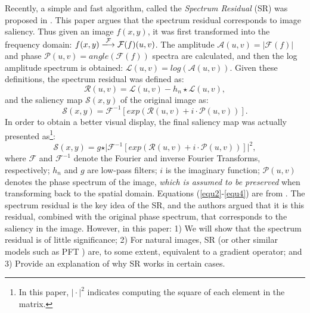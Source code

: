 \documentclass[10pt,journal,cspaper,compsoc]{IEEEtran}
\begin{document}
Recently, a simple and fast algorithm, called the {\it Spectrum Residual} (SR) was proposed in \cite{hou2007saliency}. This paper argues that the spectrum residual corresponds to image saliency. Thus given an image $f(x,y)$, it was first transformed into the frequency domain: $f(x,y)\xlongrightarrow{\mathcal F}{\mathcal F}(f)(u,v) $.
The amplitude ${\mathcal A}(u,v)=|{\mathcal F}(f)|$ and phase ${\mathcal P}(u,v) =angle({\mathcal F}(f))$ spectra are calculated, and then the log amplitude spectrum is obtained: ${\mathcal L}(u,v)=log({\mathcal A}(u,v))$. Given these definitions, the spectrum residual was defined as:
\begin{equation}
{\mathcal R}(u,v)={\mathcal L}(u,v)-h_{n}\star{\mathcal L}(u,v),  \label {equ2}
\end {equation}
and the saliency map ${\mathcal S}(x,y)$ of the original image as:
\begin{equation}
{\mathcal S}(x,y)={\mathcal F}^{-1}[exp({\mathcal R}(u,v)+i\cdot{\mathcal P}(u,v))].  \label {equ3}
\end {equation}
In order to obtain a better visual display, the final saliency map was actually presented as\footnote{In this paper, $\vert\cdot\vert^2$ indicates computing the square of each element in the matrix.}:
\begin{equation}
{\mathcal S}(x,y)=g\star\vert{\mathcal F}^{-1}[exp({\mathcal R}(u,v)+i\cdot{\mathcal P}(u,v))]\vert^2,  \label {equ4}
\end {equation}
where ${\mathcal F}$ and ${\mathcal F}^{-1}$ denote the Fourier and inverse Fourier Transforms, respectively; $h_{n}$ and $g$ are low-pass filters;  $i$ is the imaginary function; ${\mathcal P}(u,v)$ denotes the phase spectrum of the image, {\it which is assumed to be preserved} when transforming back to the spatial domain. Equations (\ref{equ2}-\ref{equ4}) are from \cite{hou2007saliency}. The spectrum residual is the key idea of the SR, and the authors argued that it is this residual, combined with the original phase spectrum, that corresponds to the saliency in the image. However, in this paper:
1) We will show that the spectrum residual is of little significance;
2) For natural images, SR (or other similar models such as PFT \cite{guo2008spatio})  are, to some extent, equivalent to a gradient operator; and
3) Provide an explanation of why SR works in certain cases.
\end{document}
